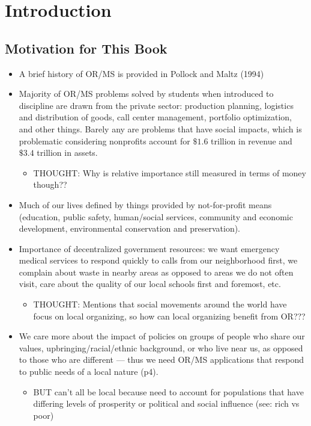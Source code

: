 \documentclass{article}
\begin{document}
\section{Introduction}
\subsection{Motivation for This Book}
\begin{itemize}
\item A brief history of OR/MS is provided in Pollock and Maltz (1994)
\item Majority of OR/MS problems solved by students when introduced to discipline are drawn from the private sector: production planning, logistics and distribution of goods, call center management, portfolio optimization, and other things. Barely any are problems that have social impacts, which is problematic considering nonprofits account for $\$ 1.6$ trillion in revenue and $\$ 3.4$ trillion in assets.
	\begin{itemize}
    \item THOUGHT: Why is relative importance still measured in terms of money though??
    \end{itemize}
\item Much of our lives defined by things provided by not-for-profit means (education, public safety, human/social services, community and economic development, environmental conservation and preservation).
\item Importance of decentralized government resources: we want emergency medical services to respond quickly to calls from our neighborhood first, we complain about waste in nearby areas as opposed to areas we do not often visit, care about the quality of our local schools first and foremost, etc. 
	\begin{itemize}
    \item THOUGHT: Mentions that social movements around the world have focus on local organizing, so how can local organizing benefit from OR???
    \end{itemize}
\item We care more about the impact of policies on groups of people who share our values, upbringing/racial/ethnic background, or who live near us, as opposed to those who are different --- thus we need OR/MS applications that respond to public needs of a local nature (p4).
	\begin{itemize}
    \item BUT can't all be local because need to account for populations that have differing levels of prosperity or political and social influence (see: rich vs poor)

\end{itemize}
\end{itemize}
\end{document}
